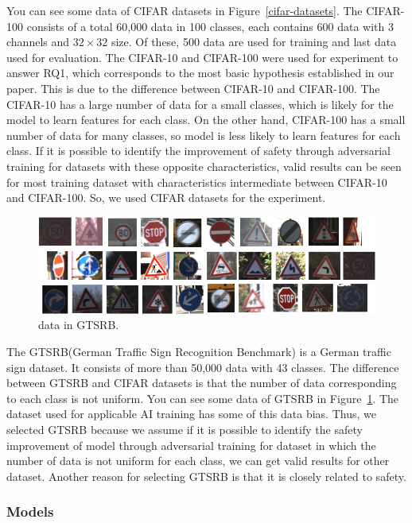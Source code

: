 \documentclass[journal,article,submit,moreauthors,pdftex]{Definitions/mdpi}
\begin{document}
You can see some data of CIFAR datasets in Figure~\ref{cifar-datasets}.
The CIFAR-100 consists of a total 60,000 data in 100 classes, each contains 600 data with 3 channels and \begin{math}{32\times 32}\end{math} size. Of these, 500 data are used for training and last data used for evaluation.
The CIFAR-10 and CIFAR-100 were used for experiment to answer RQ1, which corresponds to the most basic hypothesis established in our paper.
This is due to the difference between CIFAR-10 and CIFAR-100. The CIFAR-10 has a large number of data for a small classes, which is likely for the model to learn features for each class.
On the other hand, CIFAR-100 has a small number of data for many classes, so model is less likely to learn features for each class.
If it is possible to identify the improvement of safety through adversarial training for datasets with these opposite characteristics, valid results can be seen for most training dataset with characteristics intermediate between CIFAR-10 and CIFAR-100. So, we used CIFAR datasets for the experiment.

\begin{figure}[H]
\includegraphics[width=13 cm]{Definitions/gtsrb-dataset.png}
\caption{data in GTSRB.\label{gtsrb-datasets}}
\end{figure} 

The GTSRB(German Traffic Sign Recognition Benchmark) is a German traffic sign dataset. It consists of more than 50,000 data with 43 classes.
The difference between GTSRB and CIFAR datasets is that the number of data corresponding to each class is not uniform.
You can see some data of GTSRB in Figure~\ref{gtsrb-datasets}.
The dataset used for applicable AI training has some of this data bias.
Thus, we selected GTSRB because we assume if it is possible to identify the safety improvement of model through adversarial training for dataset in which the number of data is not uniform for each class, we can get valid results for other dataset.
Another reason for selecting GTSRB is that it is closely related to safety.

\subsubsection{Models}
\end{document}
